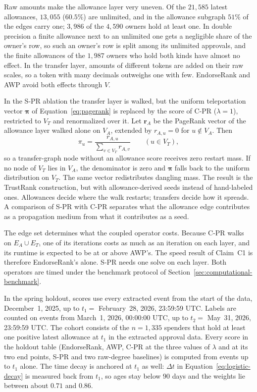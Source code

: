 Raw amounts make the allowance layer very uneven. Of the $21{,}585$ latest allowances, $13{,}055$ ($60.5\%$) are unlimited, and in the allowance subgraph $51\%$ of the edges carry one; $3{,}986$ of the $4{,}590$ owners hold at least one. In double precision a finite allowance next to an unlimited one gets a negligible share of the owner's row, so such an owner's row is split among its unlimited approvals, and the finite allowances of the $1{,}987$ owners who hold both kinds have almost no effect. In the transfer layer, amounts of different tokens are added on their raw scales, so a token with many decimals outweighs one with few. EndorseRank and AWP avoid both effects through $V$.

In the S-PR ablation the transfer layer is walked, but the uniform teleportation vector $\boldsymbol{\pi}$ of Equation~\eqref{eq:pagerank} is replaced by the score of C-PR ($\lambda=1$), restricted to $V_T$ and renormalized over it. Let $\mathbf{r}_{A}$ be the PageRank vector of the allowance layer walked alone on $V_A$, extended by $r_{A,u}=0$ for $u\notin V_A$. Then
\[
\pi_u=\frac{r_{A,u}}{\sum_{v\in V_T} r_{A,v}}\qquad(u\in V_T),
\]
so a transfer-graph node without an allowance score receives zero restart mass. If no node of $V_T$ lies in $V_A$, the denominator is zero and $\boldsymbol{\pi}$ falls back to the uniform distribution on $V_T$. The same vector redistributes dangling mass. The result is the TrustRank construction, but with allowance-derived seeds instead of hand-labeled ones. Allowances decide where the walk restarts; transfers decide how it spreads. A comparison of S-PR with C-PR separates what the allowance edge contributes as a propagation medium from what it contributes as a seed.

The edge set determines what the coupled operator costs. Because C-PR walks on $E_A\cup E_T$, one of its iterations costs as much as an iteration on each layer, and its runtime is expected to be at or above AWP's. The speed result of Claim~C1 is therefore EndorseRank's alone. S-PR needs one solve on each layer. Both operators are timed under the benchmark protocol of Section~\ref{sec:computational-benchmark}.


In the spring holdout, scores use every extracted event from the start of the data, December~1, 2025, up to $t_1=$ February~28, 2026, 23:59:59 UTC. Labels are counted on events from March~1, 2026, 00:00:00 UTC, up to $t_2=$ May~31, 2026, 23:59:59 UTC. The cohort consists of the $n=1{,}335$ spenders that hold at least one positive latest allowance at $t_1$ in the extracted approval data. Every score in the holdout table (EndorseRank, AWP, C-PR at the three values of $\lambda$ and at its two end points, S-PR and two raw-degree baselines) is computed from events up to $t_1$ alone. The time decay is anchored at $t_1$ as well: $\Delta t$ in Equation~\eqref{eq:logistic-decay} is measured back from $t_1$, so ages stay below $90$ days and the weights lie between about $0.71$ and $0.86$.

